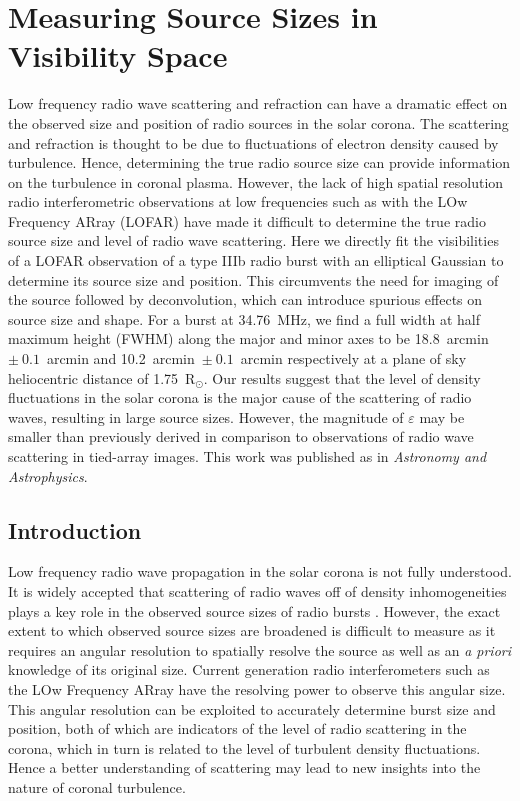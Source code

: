 \doublespacing
\chapter{Measuring Source Sizes in Visibility Space}
\label{chap:measuring_source_sizes}

Low frequency radio wave scattering and refraction can have a dramatic effect on the observed size and position of radio sources in the solar corona.
The scattering and refraction is thought to be due to fluctuations of electron density caused by turbulence. Hence, determining the true radio source size can provide information on the turbulence in coronal plasma.
However, the lack of high spatial resolution radio interferometric observations at low frequencies such as with the LOw Frequency ARray (LOFAR) have made it difficult to determine the true radio source size and level of radio wave scattering.
Here we directly fit the visibilities of a LOFAR observation of a type IIIb radio burst with an elliptical Gaussian to determine its source size and position. This circumvents the need for imaging of the source followed by deconvolution, which can introduce spurious effects on source size and shape.
For a burst at 34.76~MHz, we find a full width at half maximum height (FWHM) along the major and minor axes to be 18.8~arcmin~$\pm~0.1$~arcmin and 10.2~arcmin~$\pm~0.1$~arcmin respectively at a plane of sky heliocentric distance of 1.75~R$_\odot$.
Our results suggest that the level of density fluctuations in the solar corona  is  the  major  cause  of  the  scattering  of  radio  waves, resulting in  large  source  sizes. However, the magnitude of $\varepsilon$ may be smaller than previously derived in comparison to observations of radio wave scattering in tied-array images. This work was published as \cite{Murphy2021} in \textit{Astronomy and Astrophysics}.

\section{Introduction} \label{sec:intro}
Low frequency radio wave propagation in the solar corona is not fully understood. It is widely accepted that scattering of radio waves off of density inhomogeneities plays a key role in the observed source sizes of radio bursts \citep{Fokker1965,Steinberg1971,Stewart1972,Riddle1974,Thejappa2007,Thejappa2008,Kontar2019}. However, the exact extent to which observed source sizes are broadened is difficult to measure as it requires an angular resolution to spatially resolve the source as well as an \textit{a priori} knowledge of its original size.
Current generation radio interferometers such as the LOw Frequency ARray \citep[LOFAR;][]{VanHaarlem2013} have the resolving power to observe this angular size. This angular resolution can be exploited to accurately determine burst size and position, both of which are indicators of the level of radio scattering in the corona, which in turn is related to the level of turbulent density fluctuations. Hence a better understanding of scattering may lead to new insights into the nature of coronal turbulence.

